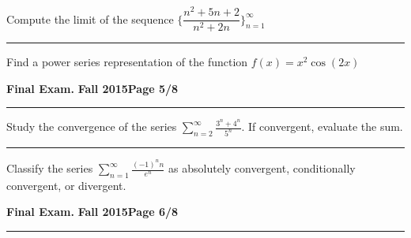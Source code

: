 \documentclass[12pt]{article}
\theoremstyle{definition}
\begin{document}
{{ Compute the limit of the sequence $\bigg\{
\dfrac{n^2+5n+2}{n^2+2n} \bigg\}_{n=1}^\infty$}
\vspace{4cm}
\begin{flushright}
\end{flushright}
\hrule

{\problem[5 pts] Find a power series representation of the function $f(x) = x^2 \cos (2x)$}
\vspace{5cm}
\begin{flushright}
\end{flushright}

\newpage

\hfill{\large\bf Final Exam.}\hfill{\large\bf
  Fall 2015}\hfill{\large\bf Page 5/8}\hrule
  
\bigskip

{\problem[10 pts] Study the convergence of the series
  $\displaystyle{\sum_{n=2}^\infty \frac{3^n+4^n}{5^n}}$.  If
  convergent, evaluate the sum.
\vspace{6.5cm}
\begin{flushright}
\end{flushright}
\hrule
{\problem[10 pts] Classify the series $\displaystyle{\sum_{n=1}^\infty
    \frac{(-1)^n n}{e^n}}$ as absolutely
  convergent, conditionally convergent, or divergent.}
\vspace{6.5cm}
\begin{flushright}
\end{flushright}
\newpage

\hfill{\large\bf Final Exam.}\hfill{\large\bf
  Fall 2015}\hfill{\large\bf Page 6/8}\hrule

}}
\end{document}
